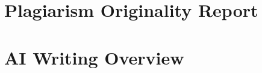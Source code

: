 \documentclass[12pt, a4paper]{report}
\begin{document}

\chapter{Plagiarism Originality Report}
\label{app:plagiarism}
 

\chapter{AI Writing Overview}
\label{app:ai_report}


\end{document}
